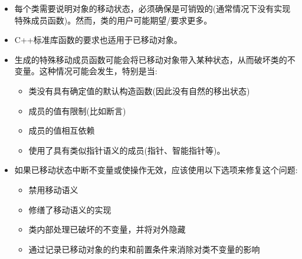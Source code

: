 \begin{itemize}
  \item 每个类需要说明对象的移动状态，必须确保是可销毁的(通常情况下没有实现特殊成员函数)。然而，类的用户可能期望/要求更多。
  \item C++标准库函数的要求也适用于已移动对象。
  \item 生成的特殊移动成员函数可能会将已移动对象带入某种状态，从而破坏类的不变量。这种情况可能会发生，特别是当:
  \begin{itemize}
    \item[-] 类没有具有确定值的默认构造函数(因此没有自然的移出状态)
    \item[-] 成员的值有限制(比如断言)
    \item[-] 成员的值相互依赖
    \item[-] 使用了具有类似指针语义的成员(指针、智能指针等)。
  \end{itemize}
  \item 如果已移动状态中断不变量或使操作无效，应该使用以下选项来修复这个问题:
  \begin{itemize}
    \item[-] 禁用移动语义
    \item[-] 修缮了移动语义的实现
    \item[-] 类内部处理已破坏的不变量，并将对外隐藏
    \item[-] 通过记录已移动对象的约束和前置条件来消除对类不变量的影响
  \end{itemize}
\end{itemize}
